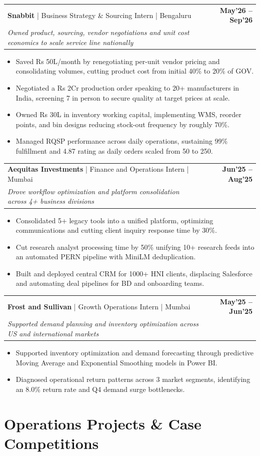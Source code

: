 \documentclass[10pt, a4paper]{article}
\makeatletter
\newcommand{\jobheader}[4]{
  \vspace{-1pt}
  \begin{tabular*}{\textwidth}[t]{l@{\extracolsep{\fill}}r}
    \textbf{#1} \quad | \quad #3 & \textbf{\small #4} \\
    \textit{\small #2} & \\
  \end{tabular*}
  \vspace{-2pt}
}
\newenvironment{achievelist}{
  \begin{itemize}[leftmargin=1.2em, itemsep=0.5pt, parsep=0pt, topsep=1pt]
    \small
}{
  \end{itemize}
  \vspace{-2pt}
}
\newcommand{\achieve}[1]{\item #1}
\makeatother
\begin{document}
\jobheader{Snabbit}{Owned product, sourcing, vendor negotiations and unit cost economics to scale service line nationally}{Business Strategy \& Sourcing Intern | Bengaluru}{May'26 -- Sep'26}
\begin{achievelist}
  \achieve{Saved Rs 50L/month by renegotiating per-unit vendor pricing and consolidating volumes, cutting product cost from initial 40\% to 20\% of GOV.}
  \achieve{Negotiated a Rs 2Cr production order speaking to 20+ manufacturers in India, screening 7 in person to secure quality at target prices at scale.}
  \achieve{Owned Rs 30L in inventory working capital, implementing WMS, reorder points, and bin designs reducing stock-out frequency by roughly 70\%.}
  \achieve{Managed RQSP performance across daily operations, sustaining 99\% fulfillment and 4.87 rating as daily orders scaled from 50 to 250.}
\end{achievelist}

\jobheader{Aequitas Investments}{Drove workflow optimization and platform consolidation across 4+ business divisions}{Finance and Operations Intern | Mumbai}{Jun'25 -- Aug'25}
\begin{achievelist}
  \achieve{Consolidated 5+ legacy tools into a unified platform, optimizing communications and cutting client inquiry response time by 30\%.}
  \achieve{Cut research analyst processing time by 50\% unifying 10+ research feeds into an automated PERN pipeline with MiniLM deduplication.}
  \achieve{Built and deployed central CRM for 1000+ HNI clients, displacing Salesforce and automating deal pipelines for BD and onboarding teams.}
\end{achievelist}

\jobheader{Frost and Sullivan}{Supported demand planning and inventory optimization across US and international markets}{Growth Operations Intern | Mumbai}{May'25 -- Jun'25}
\begin{achievelist}
  \achieve{Supported inventory optimization and demand forecasting through predictive Moving Average and Exponential Smoothing models in Power BI.}
  \achieve{Diagnosed operational return patterns across 3 market segments, identifying an 8.0\% return rate and Q4 demand surge bottlenecks.}
\end{achievelist}

\vspace{-2pt}

\section{Operations Projects \& Case Competitions}
\end{document}
